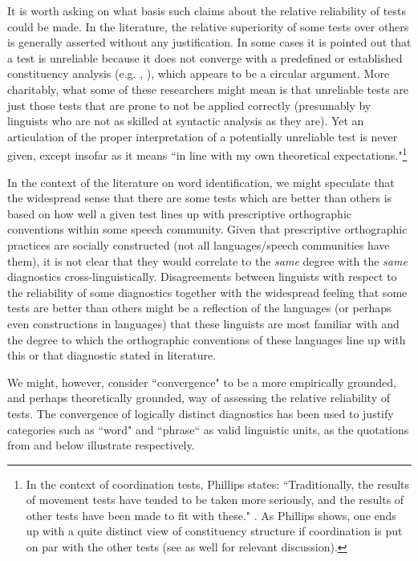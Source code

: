 \documentclass[output=paper,draftmode]{langscibook}
\begin{document}
It is worth asking on what basis such claims about the relative reliability of tests could be made. In the literature, the relative superiority of some tests over others is generally asserted without any justification. In some cases it is pointed out that a test is unreliable because it does not converge with a predefined or established constituency analysis (e.g. \citealt[162]{payne2006exploring}, \citealt[21]{carnie2008constituent}), which appears to be a circular argument. More charitably, what some of these researchers might mean is that unreliable tests are just those tests that are prone to not be applied correctly (presumably by linguists who are not as skilled at syntactic analysis as they are). 
Yet an articulation of the proper interpretation of a potentially unreliable test is never given, except insofar as it means ``in line with my own theoretical expectations."\footnote{In the context of coordination tests, Phillips states: ``Traditionally, the results of movement tests have tended to be taken more seriously, and the results of other tests have been made to fit with these." \citep[27]{phillips1996orderb}. As Phillips shows, one ends up with a quite distinct view of constituency structure if coordination is put on par with the other tests (see \citealt{osborne2018tests} as well for relevant discussion).}

In the context of the literature on word identification, we might speculate that the widespread sense that there are some tests which are better than others is based on how well a given test lines up with prescriptive orthographic conventions within some speech community. Given that prescriptive orthographic practices are socially constructed (not all languages/speech communities have them), it is not clear that they would correlate to the \textit{same} degree with the \textit{same} diagnostics cross-linguistically. Disagreements between linguists with respect to the reliability of some diagnostics together with the widespread feeling that some tests are better than others might be a reflection of the languages (or perhaps even constructions in languages) that these linguists are most familiar with and the degree to which the orthographic conventions of these languages line up with this or that diagnostic stated in literature.

We might, however, consider ``convergence" to be a more empirically grounded, and perhaps theoretically grounded, way of assessing the relative reliability of tests. The convergence of logically distinct diagnostics has been used to justify categories such as ``word" and ``phrase`` as valid linguistic units, as the quotations from \citet{matthews:words} and \citet{levine2017syntactic} below illustrate respectively.
\end{document}
